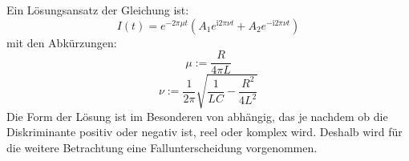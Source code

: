 Ein Lösungsansatz der Gleichung ist:
\begin{equation}
  I(t) = e^{-2\pi\mu t}(A_1 e^{\text{i}2\pi\nu t} + A_2 e^{-\text{i}2\pi\nu t})
  \label{eqn:gl7}
\end{equation}
mit den Abkürzungen:
\begin{equation}
  \mu := \frac{R}{4\pi L}
  \label{eqn:gl8}
\end{equation}
\begin{equation}
  \nu := \frac{1}{2\pi} \sqrt{\frac{1}{LC} - \frac{R^2}{4L^2}}
  \label{eqn:gl9}
\end{equation}
Die Form der Lösung ist im Besonderen von \nu abhängig, das je nachdem ob die Diskriminante positiv oder negativ ist, reel oder komplex wird.
Deshalb wird für die weitere Betrachtung eine Fallunterscheidung vorgenommen.
